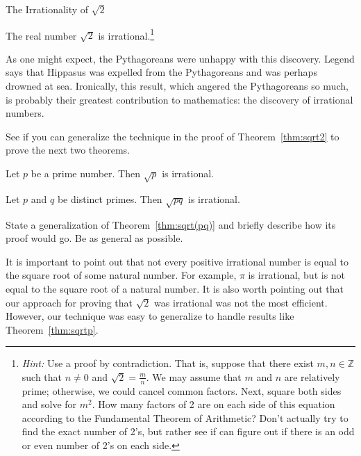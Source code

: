 \begin{section}{The Irrationality of $\sqrt{2}$}
%

\begin{theorem}\label{thm:sqrt2}
The real number $\sqrt{2}$ is irrational.\footnote{\emph{Hint:} Use a proof by contradiction.  That is, suppose that there exist $m,n\in\mathbb{Z}$ such that $n\ne 0$ and $\sqrt{2}=\frac{m}{n}$. We may assume that $m$ and $n$ are relatively prime; otherwise, we could cancel common factors. Next, square both sides and solve for $m^2$. How many factors of 2 are on each side of this equation according to the Fundamental Theorem of Arithmetic? Don't actually try to find the exact number of 2's, but rather see if can figure out if there is an odd or even number of 2's on each side.}
\end{theorem}

As one might expect, the Pythagoreans were unhappy with this discovery. Legend says that Hippasus was expelled from the Pythagoreans and was perhaps drowned at sea. Ironically, this result, which angered the Pythagoreans so much, is probably their greatest contribution to mathematics: the discovery of irrational numbers.

See if you can generalize the technique in the proof of Theorem~\ref{thm:sqrt2} to prove the next two theorems.

\begin{theorem}\label{thm:sqrtp}
Let $p$ be a prime number.  Then $\sqrt{p}$ is irrational.
\end{theorem}

\begin{theorem}\label{thm:sqrt(pq)}
Let $p$ and $q$ be distinct primes.  Then $\sqrt{pq}$ is irrational.
\end{theorem}

\begin{problem}
State a generalization of Theorem~\ref{thm:sqrt(pq)} and briefly describe how its proof would go.  Be as general as possible.
\end{problem}

It is important to point out that not every positive irrational number is equal to the square root of some natural number.  For example, $\pi$ is irrational, but is not equal to the square root of a natural number. It is also worth pointing out that our approach for proving that $\sqrt{2}$ was irrational was not the most efficient.  However, our technique was easy to generalize to handle results like Theorem~\ref{thm:sqrtp}.

\end{section}
